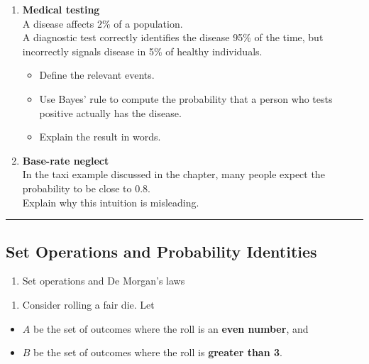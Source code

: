 \documentclass[
  letterpaper,
  DIV=11,
  numbers=noendperiod]{scrreprt}
\providecommand{\tightlist}{%
  \setlength{\itemsep}{0pt}\setlength{\parskip}{0pt}}
\begin{document}
\begin{enumerate}
\def\labelenumi{\arabic{enumi}.}
\setcounter{enumi}{14}
\tightlist
\item
  \textbf{Medical testing}\\
  A disease affects 2\% of a population.\\
  A diagnostic test correctly identifies the disease 95\% of the time,
  but incorrectly signals disease in 5\% of healthy individuals.

  \begin{itemize}
  \tightlist
  \item
    Define the relevant events.\\
  \item
    Use Bayes' rule to compute the probability that a person who tests
    positive actually has the disease.\\
  \item
    Explain the result in words.
  \end{itemize}
\item
  \textbf{Base-rate neglect}\\
  In the taxi example discussed in the chapter, many people expect the
  probability to be close to 0.8.\\
  Explain why this intuition is misleading.
\end{enumerate}

\begin{center}\rule{0.5\linewidth}{0.5pt}\end{center}

\subsection{Set Operations and Probability
Identities}\label{set-operations-and-probability-identities}

\begin{enumerate}
\def\labelenumi{\arabic{enumi}.}
\setcounter{enumi}{16}
\tightlist
\item
  Set operations and De Morgan's laws
\end{enumerate}

\begin{enumerate}
\def\labelenumi{(\alph{enumi})}
\tightlist
\item
  Consider rolling a fair die. Let\\
\end{enumerate}

\begin{itemize}
\tightlist
\item
  \(A\) be the set of outcomes where the roll is an \textbf{even
  number}, and\\
\item
  \(B\) be the set of outcomes where the roll is \textbf{greater than
  3}.
\end{itemize}
\end{document}
